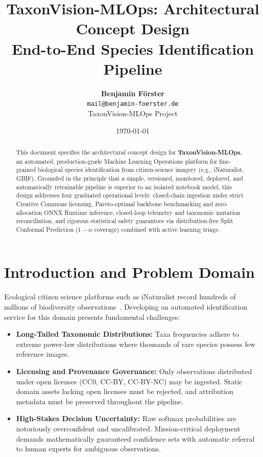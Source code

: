\documentclass[11pt,a4paper]{article}
\title{\textbf{TaxonVision-MLOps: Architectural Concept Design \\ End-to-End Species Identification Pipeline}}
\author{\textbf{Benjamin Förster} \\ \texttt{mail@benjamin-foerster.de} \\ TaxonVision-MLOps Project}
\date{\today}
\begin{document}
\maketitle

\begin{abstract}
This document specifies the architectural concept design for \textbf{TaxonVision-MLOps}, an automated, production-grade Machine Learning Operations platform for fine-grained biological species identification from citizen-science imagery (e.g., iNaturalist, GBIF). Grounded in the principle that a simple, versioned, monitored, deployed, and automatically retrainable pipeline is superior to an isolated notebook model, this design addresses four graduated operational levels: closed-chain ingestion under strict Creative Commons licensing, Pareto-optimal backbone benchmarking and zero-allocation ONNX Runtime inference, closed-loop telemetry and taxonomic mutation reconciliation, and rigorous statistical safety guarantees via distribution-free Split Conformal Prediction ($1 - \alpha$ coverage) combined with active learning triage.
\end{abstract}

\section{Introduction and Problem Domain}
Ecological citizen science platforms such as iNaturalist record hundreds of millions of biodiversity observations~\cite{vanhorn2018inaturalist}. Developing an automated identification service for this domain presents fundamental challenges:
\begin{itemize}
    \item \textbf{Long-Tailed Taxonomic Distributions:} Taxa frequencies adhere to extreme power-law distributions where thousands of rare species possess few reference images.
    \item \textbf{Licensing and Provenance Governance:} Only observations distributed under open licenses (CC0, CC-BY, CC-BY-NC) may be ingested. Static domain assets lacking open licenses must be rejected, and attribution metadata must be preserved throughout the pipeline.
    \item \textbf{High-Stakes Decision Uncertainty:} Raw softmax probabilities are notoriously overconfident and uncalibrated. Mission-critical deployment demands mathematically guaranteed confidence sets with automatic referral to human experts for ambiguous observations.
\end{itemize}
\end{document}
